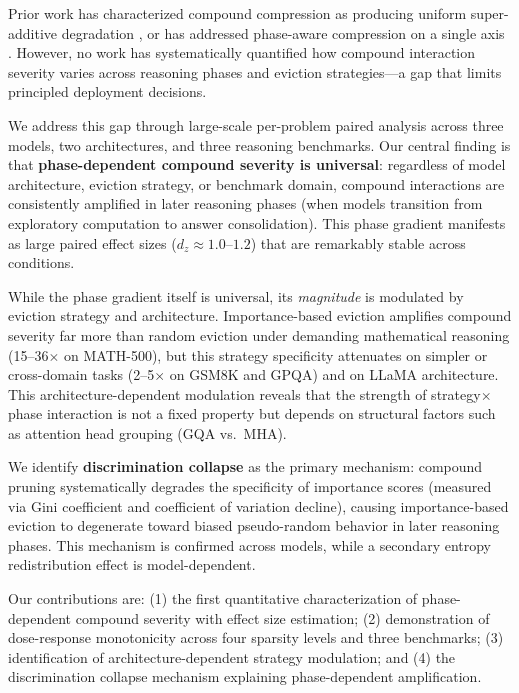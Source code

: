 \documentclass[11pt,a4paper]{article}
\begin{document}
Prior work has characterized compound compression as producing uniform super-additive degradation \cite{spark2024}, or has addressed phase-aware compression on a single axis \cite{thinkv2025}. However, no work has systematically quantified how compound interaction severity varies across reasoning phases and eviction strategies---a gap that limits principled deployment decisions.

We address this gap through large-scale per-problem paired analysis across three models, two architectures, and three reasoning benchmarks. Our central finding is that \textbf{phase-dependent compound severity is universal}: regardless of model architecture, eviction strategy, or benchmark domain, compound interactions are consistently amplified in later reasoning phases (when models transition from exploratory computation to answer consolidation). This phase gradient manifests as large paired effect sizes ($d_z \approx 1.0$--$1.2$) that are remarkably stable across conditions.

While the phase gradient itself is universal, its \emph{magnitude} is modulated by eviction strategy and architecture. Importance-based eviction amplifies compound severity far more than random eviction under demanding mathematical reasoning (15--36$\times$ on MATH-500), but this strategy specificity attenuates on simpler or cross-domain tasks (2--5$\times$ on GSM8K and GPQA) and on LLaMA architecture. This architecture-dependent modulation reveals that the strength of strategy$\times$phase interaction is not a fixed property but depends on structural factors such as attention head grouping (GQA vs.\ MHA).

We identify \textbf{discrimination collapse} as the primary mechanism: compound pruning systematically degrades the specificity of importance scores (measured via Gini coefficient and coefficient of variation decline), causing importance-based eviction to degenerate toward biased pseudo-random behavior in later reasoning phases. This mechanism is confirmed across models, while a secondary entropy redistribution effect is model-dependent.

Our contributions are: (1) the first quantitative characterization of phase-dependent compound severity with effect size estimation; (2) demonstration of dose-response monotonicity across four sparsity levels and three benchmarks; (3) identification of architecture-dependent strategy modulation; and (4) the discrimination collapse mechanism explaining phase-dependent amplification.
\end{document}
